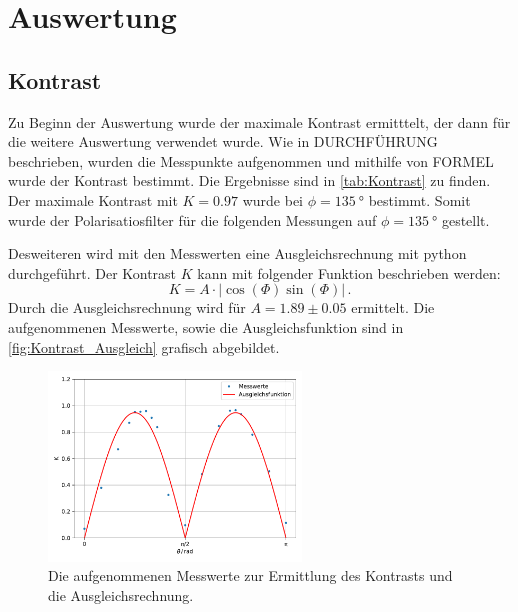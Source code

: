 \section{Auswertung}
\label{sec:Auswertung}

\subsection{Kontrast}
\label{subsec:Kontrast}
Zu Beginn der Auswertung wurde der maximale Kontrast ermitttelt, der dann für die weitere Auswertung verwendet wurde.
Wie in DURCHFÜHRUNG beschrieben, wurden die Messpunkte aufgenommen und mithilfe von FORMEL wurde der Kontrast bestimmt.
Die Ergebnisse sind in \autoref{tab:Kontrast} zu finden.
Der maximale Kontrast mit $K = \num{0.97}$ wurde bei $\phi = \SI{135}{\degree}$ bestimmt.
Somit wurde der Polarisatiosfilter für die folgenden Messungen auf $\phi = \SI{135}{\degree}$ gestellt.

\noindent
Desweiteren wird mit den Messwerten eine Ausgleichsrechnung mit python durchgeführt.
Der Kontrast $K$ kann mit folgender Funktion beschrieben werden:
\begin{equation*}
  K = A \cdot | \cos(\Phi)\sin(\Phi) | \, .
\end{equation*}
Durch die Ausgleichsrechnung wird für $A = 1.89 \pm 0.05$ ermittelt.
Die aufgenommenen Messwerte, sowie die Ausgleichsfunktion sind in \autoref{fig:Kontrast_Ausgleich} grafisch abgebildet.

\begin{figure}[h]
  \centering
  \includegraphics[width=0.6\textwidth]{build/kontrast_ausgleich.pdf}
  \caption{Die aufgenommenen Messwerte zur Ermittlung des Kontrasts und die Ausgleichsrechnung.}
  \label{fig:Kontrast_Ausgleich}
\end{figure}

